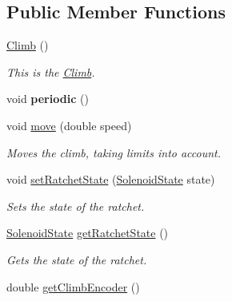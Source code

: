 \subsection*{Public Member Functions}
\begin{DoxyCompactItemize}
\item 
\mbox{\label{classfrc_1_1robot_1_1subsystems_1_1_climb_aa5ae51a7c9edcddb2e79cec6020f23eb}} 
\mbox{\hyperlink{classfrc_1_1robot_1_1subsystems_1_1_climb_aa5ae51a7c9edcddb2e79cec6020f23eb}{Climb}} ()
\begin{DoxyCompactList}\small\item\em This is the \mbox{\hyperlink{classfrc_1_1robot_1_1subsystems_1_1_climb}{Climb}}. \end{DoxyCompactList}\item 
\mbox{\label{classfrc_1_1robot_1_1subsystems_1_1_climb_a431b7dd342443d2406c596370fb261d9}} 
void {\bfseries periodic} ()
\item 
void \mbox{\hyperlink{classfrc_1_1robot_1_1subsystems_1_1_climb_a31e9316a6edd4b95b386d94edc3c418b}{move}} (double speed)
\begin{DoxyCompactList}\small\item\em Moves the climb, taking limits into account. \end{DoxyCompactList}\item 
void \mbox{\hyperlink{classfrc_1_1robot_1_1subsystems_1_1_climb_a1870264c5010978b07ac1fdb25e7b08b}{set\+Ratchet\+State}} (\mbox{\hyperlink{enumfrc_1_1robot_1_1enums_1_1_solenoid_state}{Solenoid\+State}} state)
\begin{DoxyCompactList}\small\item\em Sets the state of the ratchet. \end{DoxyCompactList}\item 
\mbox{\hyperlink{enumfrc_1_1robot_1_1enums_1_1_solenoid_state}{Solenoid\+State}} \mbox{\hyperlink{classfrc_1_1robot_1_1subsystems_1_1_climb_a41e5bb97ae26d2fbfdae9506fefdfc3a}{get\+Ratchet\+State}} ()
\begin{DoxyCompactList}\small\item\em Gets the state of the ratchet. \end{DoxyCompactList}\item 
double \mbox{\hyperlink{classfrc_1_1robot_1_1subsystems_1_1_climb_a1992333ef3c8ca85baa8499ef8a19c53}{get\+Climb\+Encoder}} ()

\end{DoxyCompactItemize}
